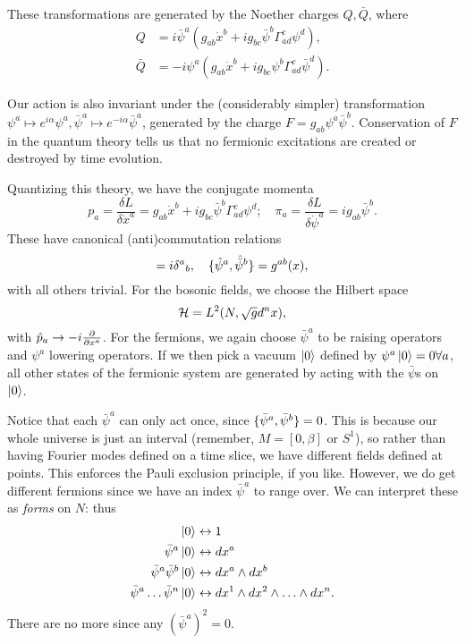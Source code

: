These transformations are generated by the Noether charges $Q,\bar Q$, where
\begin{align}
    Q &= i\bar \psi^a(g_{ab} \dot x^b +ig_{bc} \bar \psi^b \Gamma^c_{ad} \psi^d),\\
    \bar Q &= -i\psi^a(g_{ab} \dot x^b + i g_{bc} \psi^b \Gamma^c_{ad} \bar \psi^d).
\end{align}

Our action is also invariant under the (considerably simpler) transformation $\psi^a \mapsto e^{i\alpha}\psi^a, \bar \psi^a \mapsto e^{-i\alpha}\bar \psi^a$, generated by the charge $F=g_{ab} \psi^a \bar \psi^b$. Conservation of $F$ in the quantum theory tells us that no fermionic excitations are created or destroyed by time evolution.

Quantizing this theory, we have the conjugate momenta
\begin{equation}
    p_a= \frac{\delta L}{\delta \dot x^a}=g_{ab}\dot x^b + i g_{bc} \bar \psi^b \Gamma^c_{ad} \psi^d; \quad \pi_a =\frac{\delta L}{\delta \dot \psi^a}=ig_{ab} \bar \psi^b.
\end{equation}
These have canonical (anti)commutation relations
\begin{equation}
    [\hat x^a,\hat p_b]=i\delta^a{}_b,\quad \set{\hat \psi^a,\hat{\bar\psi}^b}=g^{ab}(x),
\end{equation}
with all others trivial. For the bosonic fields, we choose the Hilbert space
\begin{equation*}
    \cH =L^2(N,\sqrt{g}d^nx),
\end{equation*}
with $\hat p_a \to -i\P{}{x^a}$. For the fermions, we again choose $\bar \psi^a$ to be raising operators and $\psi^a$ lowering operators. If we then pick a vacuum $\ket{0}$ defined by $\psi^a\ket{0}=0 \forall a$, all other states of the fermionic system are generated by acting with the $\bar \psi$s on $\ket{0}$.

Notice that each $\bar \psi^a$ can only act once, since $\set{\bar \psi^a, \bar \psi^b}=0$. This is because our whole universe is just an interval (remember, $M=[0,\beta]$ or $S^1$), so rather than having Fourier modes defined on a time slice, we have different fields defined at points. This enforces the Pauli exclusion principle, if you like. However, we do get different fermions since we have an index $\bar \psi^a$ to range over. We can interpret these as \emph{forms} on $N$: thus
\begin{align}
    \ket{0} &\leftrightarrow 1\\
    \bar \psi^a \ket{0} &\leftrightarrow dx^a\\
    \bar \psi^a \bar \psi^b \ket{0} &\leftrightarrow dx^a \wedge dx^b\\
    \bar \psi^a \ldots \bar \psi^n \ket{0} &\leftrightarrow dx^1 \wedge dx^2 \wedge \ldots \wedge dx^n.
\end{align}
There are no more since any $(\bar \psi^a)^2=0$.

